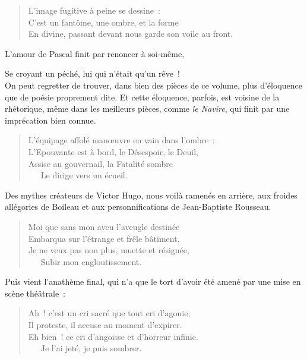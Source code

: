 \documentclass[french,twoside]{book} %
\begin{document}
\begin{verse}
L’image fugitive à peine se dessine :\\
C’est un fantôme, une ombre, et la forme\\
En divine, passant devant nous garde son voile au front.\\
\end{verse}

\noindent L’amour de Pascal finit par renoncer à soi-même,\par

Se croyant un péché, lui qui n’était qu’un rêve !\\

\noindent On peut regretter de trouver, dans bien des pièces de ce volume, plus d’éloquence que de poésie proprement dite. Et cette éloquence, parfois, est voisine de la rhétorique, même dans les meilleurs pièces, comme \emph{le Navire}, qui finit par une imprécation bien connue.\par


\begin{verse}
L’équipage affolé manœuvre en vain dans l’ombre :\\
L’Epouvante est à bord, le Désespoir, le Deuil,\\
Assise au gouvernail, la Fatalité sombre\\
   Le dirige vers un écueil.\\
\end{verse}

\noindent Des mythes créateurs de Victor Hugo, nous voilà ramenés en arrière, aux froides allégories de Boileau et aux personnifications de Jean-Baptiste Rousseau.\par


\begin{verse}
Moi que sans mon aveu l’aveugle destinée\\
Embarqua sur l’étrange et frêle bâtiment,\\
Je ne veux pas non plus, muette et résignée,\\
   Subir mon engloutissement.\\
\end{verse}

\noindent Puis vient l’anathème final, qui n’a que le tort d’avoir été amené par une mise en scène théâtrale :\par


\begin{verse}
Ah ! c’est un cri sacré que tout cri d’agonie,\\
Il proteste, il accuse au moment d’expirer.\\
Eh bien ! ce cri d’angoisse et d’horreur infinie.\\
   Je l’ai jeté, je puis sombrer.\\
\end{verse}
\end{document}
